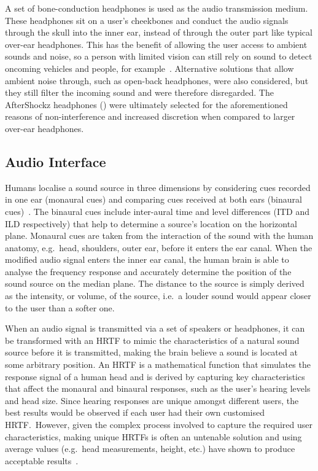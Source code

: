 \documentclass[acmsmall]{acmart}
\begin{document}
A set of bone-conduction headphones is used as the audio transmission medium.
These headphones sit on a user's cheekbones and conduct the audio signals through the skull into the inner ear, instead of through the outer part like typical over-ear headphones. 
This has the benefit of allowing the user access to ambient sounds and noise, so a person with limited vision can still rely on sound to detect oncoming vehicles and people, for example~\cite{lichtenstein2012headphone}.
Alternative solutions that allow ambient noise through, such as open-back headphones, were also considered, but they still filter the incoming sound and were therefore disregarded.
The AfterShockz headphones () were ultimately selected for the aforementioned reasons of non-interference and increased discretion when compared to larger over-ear headphones. 

\subsection{Audio Interface}

Humans localise a sound source in three dimensions by considering cues recorded in one ear (monaural cues) and comparing cues received at both ears (binaural cues)~\citep{blauert1997spatial,blauert1969sound}.
The binaural cues include inter-aural time and level differences (ITD and ILD respectively) that help to determine a source's location on the horizontal plane.
Monaural cues are taken from the interaction of the sound with the human anatomy, e.g.\ head, shoulders, outer ear, before it enters the ear canal.
When the modified audio signal enters the inner ear canal, the human brain is able to analyse the frequency response and accurately determine the position of the sound source on the median plane. 
The distance to the source is simply derived as the intensity, or volume, of the source, i.e.\ a louder sound would appear closer to the user than a softer one. 

When an audio signal is transmitted via a set of speakers or headphones, it can be transformed with an HRTF to mimic the characteristics of a natural sound source before it is transmitted, making the brain believe a sound is located at some arbitrary position.
An HRTF is a mathematical function that simulates the response signal of a human head and is derived by capturing key characteristics that affect the monaural and binaural responses, such as the user's hearing levels and head size.
Since hearing responses are unique amongst different users, the best results would be observed if each user had their own customised HRTF.\
However, given the complex process involved to capture the required user characteristics, making unique HRTFs is often an untenable solution and using average values (e.g.\ head measurements, height, etc.) have shown to produce acceptable results~\citep{gardner1995hrtf}.
\end{document}
